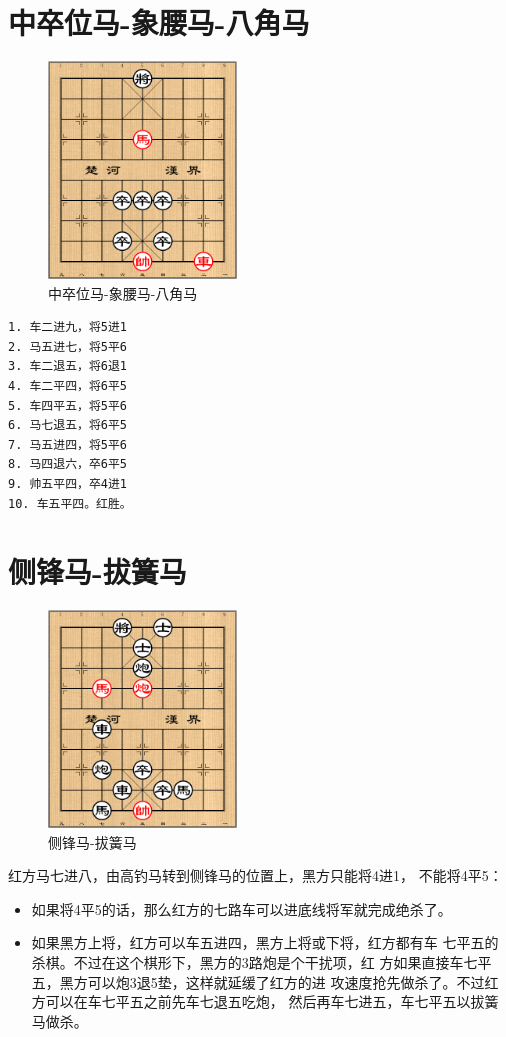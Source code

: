 \documentclass[a5paper,twoside]{book}
\begin{document}
\section{中卒位马-象腰马-八角马}
\label{sec-6-6}
\begin{figure}[H]
\centering
\includegraphics[width=5cm]{pic/中卒位马-象腰马-八角马.png}
\caption{中卒位马-象腰马-八角马}
\end{figure}

\begin{verbatim}
1. 车二进九，将5进1
2. 马五进七，将5平6
3. 车二退五，将6退1
4. 车二平四，将6平5
5. 车四平五，将5平6
6. 马七退五，将6平5
7. 马五进四，将5平6
8. 马四退六，卒6平5
9. 帅五平四，卒4进1
10. 车五平四。红胜。
\end{verbatim}

\section{侧锋马-拔簧马}
\label{sec-6-7}
\begin{figure}[H]
\centering
\includegraphics[width=5cm]{pic/侧锋马-拔簧马.png}
\caption{侧锋马-拔簧马}
\end{figure}

红方马七进八，由高钓马转到侧锋马的位置上，黑方只能将4进1，
不能将4平5：
\begin{itemize}
\item 如果将4平5的话，那么红方的七路车可以进底线将军就完成绝杀了。
\item 如果黑方上将，红方可以车五进四，黑方上将或下将，红方都有车
七平五的杀棋。不过在这个棋形下，黑方的3路炮是个干扰项，红
方如果直接车七平五，黑方可以炮3退5垫，这样就延缓了红方的进
攻速度抢先做杀了。不过红方可以在车七平五之前先车七退五吃炮，
然后再车七进五，车七平五以拔簧马做杀。
\end{itemize}
\end{document}
